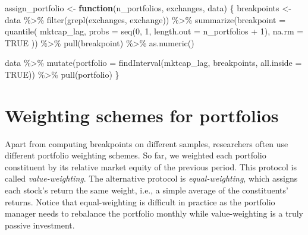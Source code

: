 \documentclass[
]{krantz}
\newenvironment{Shaded}{\begin{snugshade}}{\end{snugshade}}
\newcommand{\AttributeTok}[1]{\textcolor[rgb]{0.61,0.61,0.61}{#1}}
\newcommand{\ConstantTok}[1]{\textcolor[rgb]{0,0,0}{#1}}
\newcommand{\ControlFlowTok}[1]{\textcolor[rgb]{0.27,0.27,0.27}{\textbf{#1}}}
\newcommand{\DecValTok}[1]{\textcolor[rgb]{0.06,0.06,0.06}{#1}}
\newcommand{\FunctionTok}[1]{\textcolor[rgb]{0,0,0}{#1}}
\newcommand{\NormalTok}[1]{#1}
\newcommand{\OtherTok}[1]{\textcolor[rgb]{0.37,0.37,0.37}{#1}}
\newcommand{\SpecialCharTok}[1]{\textcolor[rgb]{0,0,0}{#1}}
\begin{document}
\begin{Shaded}
\begin{Highlighting}[]
\NormalTok{assign\_portfolio }\OtherTok{\textless{}{-}} \ControlFlowTok{function}\NormalTok{(n\_portfolios,}
\NormalTok{                             exchanges,}
\NormalTok{                             data) \{}
\NormalTok{  breakpoints }\OtherTok{\textless{}{-}}\NormalTok{ data }\SpecialCharTok{\%\textgreater{}\%}
    \FunctionTok{filter}\NormalTok{(}\FunctionTok{grepl}\NormalTok{(exchanges, exchange)) }\SpecialCharTok{\%\textgreater{}\%}
    \FunctionTok{summarize}\NormalTok{(}\AttributeTok{breakpoint =} \FunctionTok{quantile}\NormalTok{(}
\NormalTok{      mktcap\_lag,}
      \AttributeTok{probs =} \FunctionTok{seq}\NormalTok{(}\DecValTok{0}\NormalTok{, }\DecValTok{1}\NormalTok{, }\AttributeTok{length.out =}\NormalTok{ n\_portfolios }\SpecialCharTok{+} \DecValTok{1}\NormalTok{),}
      \AttributeTok{na.rm =} \ConstantTok{TRUE}
\NormalTok{    )) }\SpecialCharTok{\%\textgreater{}\%}
    \FunctionTok{pull}\NormalTok{(breakpoint) }\SpecialCharTok{\%\textgreater{}\%}
    \FunctionTok{as.numeric}\NormalTok{()}

\NormalTok{  data }\SpecialCharTok{\%\textgreater{}\%}
    \FunctionTok{mutate}\NormalTok{(}\AttributeTok{portfolio =} \FunctionTok{findInterval}\NormalTok{(mktcap\_lag, breakpoints, }\AttributeTok{all.inside =} \ConstantTok{TRUE}\NormalTok{)) }\SpecialCharTok{\%\textgreater{}\%}
    \FunctionTok{pull}\NormalTok{(portfolio)}
\NormalTok{\}}
\end{Highlighting}
\end{Shaded}

\hypertarget{weighting-schemes-for-portfolios}{%
\section{Weighting schemes for portfolios}\label{weighting-schemes-for-portfolios}}

Apart from computing breakpoints on different samples, researchers often use different portfolio weighting schemes. So far, we weighted each portfolio constituent by its relative market equity of the previous period. This protocol is called \emph{value-weighting}. The alternative protocol is \emph{equal-weighting}, which assigns each stock's return the same weight, i.e., a simple average of the constituents' returns. Notice that equal-weighting is difficult in practice as the portfolio manager needs to rebalance the portfolio monthly while value-weighting is a truly passive investment.
\end{document}
